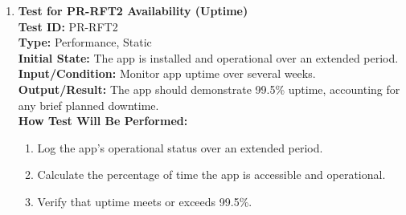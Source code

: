 \documentclass[12pt, titlepage]{article}
\begin{document}
\begin{enumerate}
    \item \textbf{Test for PR-RFT2 Availability (Uptime)} \\
      \newline
      \textbf{Test ID:} PR-RFT2 \\
      \textbf{Type:} Performance, Static \\
      \textbf{Initial State:} The app is installed and operational over an extended period. \\
      \textbf{Input/Condition:} Monitor app uptime over several weeks. \\
      \textbf{Output/Result:} The app should demonstrate 99.5\% uptime, accounting for any brief planned downtime. \\
      \textbf{How Test Will Be Performed:}
      \begin{enumerate}
          \item Log the app’s operational status over an extended period.
          \item Calculate the percentage of time the app is accessible and operational.
          \item Verify that uptime meets or exceeds 99.5\%.
      \end{enumerate}


\end{enumerate}
\end{document}
